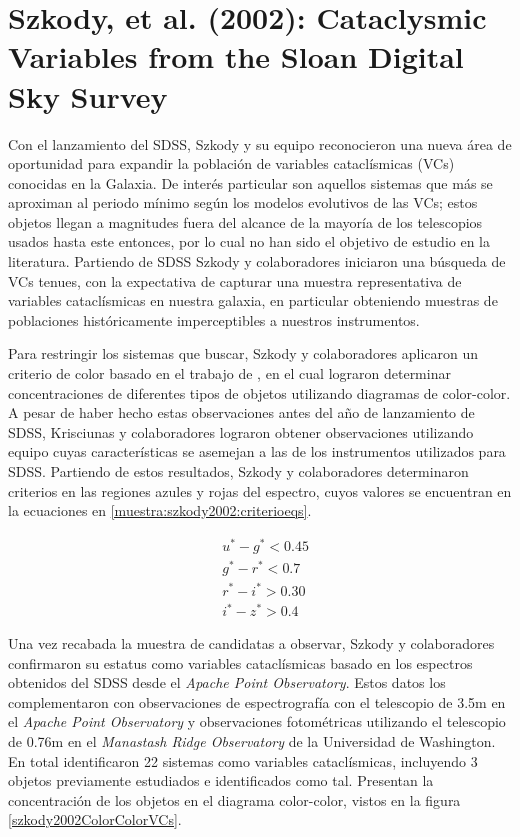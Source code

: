 \section{Szkody, et al. (2002): Cataclysmic Variables from the Sloan Digital Sky Survey} \label{muestra:szkody2002}

Con el lanzamiento del SDSS, Szkody y su equipo reconocieron una nueva área de
oportunidad para expandir la población de variables cataclísmicas (VCs)
conocidas en la Galaxia. De interés particular son aquellos sistemas que más se
aproximan al periodo mínimo según los modelos evolutivos de las VCs; estos
objetos llegan a magnitudes fuera del alcance de la mayoría de los telescopios
usados hasta este entonces, por lo cual no han sido el objetivo de estudio en la
literatura. Partiendo de SDSS Szkody y colaboradores iniciaron una búsqueda de
VCs tenues, con la expectativa de capturar una muestra representativa de
variables cataclísmicas en nuestra galaxia, en particular obteniendo muestras de
poblaciones históricamente imperceptibles a nuestros instrumentos.

Para restringir los sistemas que buscar, Szkody y colaboradores aplicaron un
criterio de color basado en el trabajo de , en
el cual lograron determinar concentraciones de diferentes tipos de objetos
utilizando diagramas de color-color. A pesar de haber hecho estas observaciones
antes del año de lanzamiento de SDSS, Krisciunas y colaboradores lograron
obtener observaciones utilizando equipo cuyas características se asemejan a las
de los instrumentos utilizados para SDSS. Partiendo de estos resultados, Szkody
y colaboradores determinaron criterios en las regiones azules y rojas del
espectro, cuyos valores se encuentran en la ecuaciones en 
\ref{muestra:szkody2002:criterioeqs}.

\begin{equation} \label{muestra:szkody2002:criterioeqs}
	\begin{split}
		& u^* - g^* < 0.45 \\
		& g^* - r^* < 0.7 \\
		& r^* - i^* > 0.30 \\
		& i^* - z^* > 0.4
	\end{split}
\end{equation}

Una vez recabada la muestra de candidatas a observar, Szkody y colaboradores
confirmaron su estatus como variables cataclísmicas basado en los espectros
obtenidos del SDSS desde el \textit{Apache Point Observatory}. Estos datos los
complementaron con observaciones de espectrografía con el telescopio de 3.5m en
el \textit{Apache Point Observatory} y observaciones fotométricas utilizando el
telescopio de 0.76m en el \textit{Manastash Ridge Observatory} de la Universidad
de Washington. En total identificaron 22 sistemas como variables cataclísmicas,
incluyendo 3 objetos previamente estudiados e identificados como tal. Presentan
la concentración de los objetos en el diagrama color-color, vistos en la figura
\ref{szkody2002ColorColorVCs}. 

